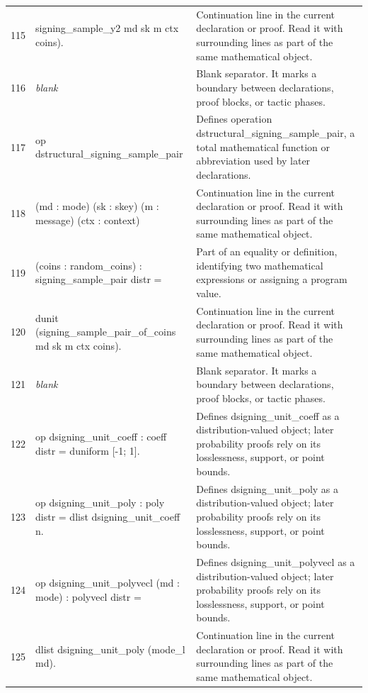 \documentclass[10pt]{article}
\begin{document}
\begin{longtable}{r L{0.53\textwidth} L{0.37\textwidth}}
115 & {\ttfamily\scriptsize    signing\_sample\_y2 md sk m ctx coins).} & Continuation line in the current declaration or proof.  Read it with surrounding lines as part of the same mathematical object. \\
116 & {\ttfamily\scriptsize \emph{blank}} & Blank separator.  It marks a boundary between declarations, proof blocks, or tactic phases. \\
117 & {\ttfamily\scriptsize op dstructural\_signing\_sample\_pair} & Defines operation dstructural\_signing\_sample\_pair, a total mathematical function or abbreviation used by later declarations. \\
118 & {\ttfamily\scriptsize    (md : mode) (sk : skey) (m : message) (ctx : context)} & Continuation line in the current declaration or proof.  Read it with surrounding lines as part of the same mathematical object. \\
119 & {\ttfamily\scriptsize    (coins : random\_coins) : signing\_sample\_pair distr =} & Part of an equality or definition, identifying two mathematical expressions or assigning a program value. \\
120 & {\ttfamily\scriptsize   dunit (signing\_sample\_pair\_of\_coins md sk m ctx coins).} & Continuation line in the current declaration or proof.  Read it with surrounding lines as part of the same mathematical object. \\
121 & {\ttfamily\scriptsize \emph{blank}} & Blank separator.  It marks a boundary between declarations, proof blocks, or tactic phases. \\
122 & {\ttfamily\scriptsize op dsigning\_unit\_coeff : coeff distr = duniform [-1; 1].} & Defines dsigning\_unit\_coeff as a distribution-valued object; later probability proofs rely on its losslessness, support, or point bounds. \\
123 & {\ttfamily\scriptsize op dsigning\_unit\_poly : poly distr = dlist dsigning\_unit\_coeff n.} & Defines dsigning\_unit\_poly as a distribution-valued object; later probability proofs rely on its losslessness, support, or point bounds. \\
124 & {\ttfamily\scriptsize op dsigning\_unit\_polyvecl (md : mode) : polyvecl distr =} & Defines dsigning\_unit\_polyvecl as a distribution-valued object; later probability proofs rely on its losslessness, support, or point bounds. \\
125 & {\ttfamily\scriptsize   dlist dsigning\_unit\_poly (mode\_l md).} & Continuation line in the current declaration or proof.  Read it with surrounding lines as part of the same mathematical object. \\

\end{longtable}
\end{document}
